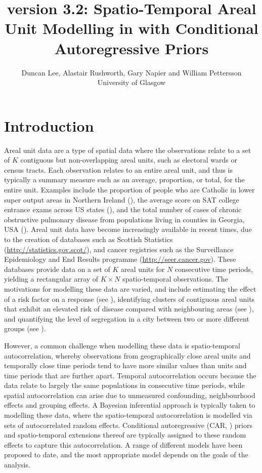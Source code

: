 \documentclass[article, nojss]{jss}
\author{Duncan Lee, Alastair Rushworth, Gary Napier and William Pettersson
\\University of Glasgow}
\title{\pkg{CARBayesST} version 3.2: Spatio-Temporal Areal Unit Modelling in \proglang{R} with Conditional Autoregressive Priors}
\begin{document}





\section{Introduction}
Areal unit data are a type of spatial data where the observations relate to a set of $K$ contiguous but non-overlapping areal units, such as electoral wards or census tracts. Each observation relates to an entire areal unit, and thus is typically a summary measure such as an average, proportion, or total, for the entire unit. Examples include the proportion of people who are Catholic in lower super output areas in Northern Ireland (\citealp{lee2015}), the average score on SAT college entrance exams across US states (\citealp{wall2004}), and the total number of cases of chronic obstructive pulmonary disease from populations living in counties in Georgia, USA (\citealp{choiENV11}). Areal unit data have become increasingly available in recent times, due to the creation of databases such as Scottish Statistics (\url{http://statistics.gov.scot/}), and cancer registries such as the Surveillance Epidemiology and End Results programme (\url{http://seer.cancer.gov}). These databases provide data on a set of $K$ areal units for $N$ consecutive time periods, yielding a rectangular array of $K\times N$ spatio-temporal observations. The motivations for modelling these data are varied, and include estimating the effect of a risk factor on a response (see \citealp{wakefield2007}), identifying clusters of contiguous areal units that exhibit an elevated risk of disease compared with neighbouring areas (see \citealp{anderson2014}), and quantifying the level of segregation in a city between two or more different groups (see \citealp{lee2015}). 
 

\hspace{1cm} However, a common challenge when modelling these data is spatio-temporal autocorrelation, whereby observations from geographically close areal units and temporally close time periods tend to have more similar values than units and time periods that are further apart. Temporal autocorrelation occurs because the data relate to largely the same populations in consecutive time periods, while spatial autocorrelation can arise due to unmeasured confounding, neighbourhood effects and grouping effects. A Bayesian inferential approach is typically taken to modelling these data, where the spatio-temporal autocorrelation is modelled via sets of autocorrelated random effects. Conditional autoregressive (CAR, \citealp{besag1991}) priors and spatio-temporal extensions thereof  are typically assigned to these random effects to capture this autocorrelation.  A range of different models have been proposed to date, and the most appropriate model depends on the goals of the analysis.
\end{document}
